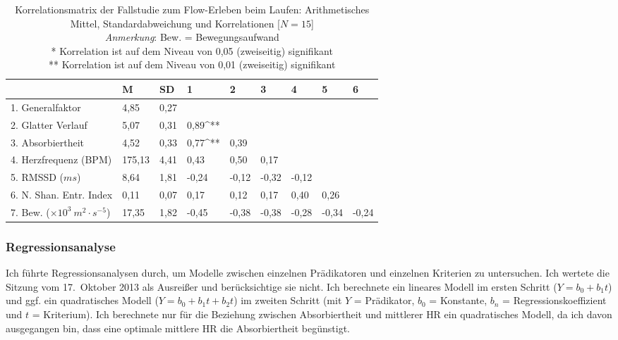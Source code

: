 \begin{sidewaystable}
\centering
	\caption[Korrelationsmatrix (Fallstudie: Laufen)]{Korrelationsmatrix der Fallstudie zum Flow-Erleben beim Laufen: Arithmetisches Mittel, Standardabweichung und Korrelationen [$N = 15$]\\ \hspace{\textwidth} \emph{Anmerkung}: Bew. = Bewegungsaufwand \\ \hspace{\textwidth}* Korrelation ist auf dem Niveau von 0,05 (zweiseitig) signifikant \\ \hspace{\textwidth}** Korrelation ist auf dem Niveau von 0,01 (zweiseitig) signifikant}
	\label{tab:korrelationen_fallstudie_laufen}
\begin{tabular}{lxxxxxxxx}
\toprule
& M & SD & 1 & 2 & 3 & 4 & 5 & 6 \\
. Generalfaktor & 4,85 & 0,27 & & & & & & \\
2. Glatter Verlauf & 5,07 & 0,31 & 0,89^{**} & & & & & \\
3. Absorbiertheit & 4,52 & 0,33 & 0,77^{**} & 0,39 & & & & \\
4. Herzfrequenz (BPM) & 175,13 & 4,41 & 0,43 & 0,50 & 0,17 & & & \\
5. RMSSD ($ms$) & 8,64 & 1,81 & -0,24 & -0,12 & -0,32 & -0,12 & & \\
6. N. Shan. Entr. Index & 0,11 & 0,07 & 0,17 & 0,12 & 0,17 & 0,40 & 0,26 & \\
7. Bew. ($\times 10^3 \: m^2 \cdot s^{-5}$) & 17,35 & 1,82 & -0,45 & -0,38 & -0,38 & -0,28 & -0,34 & -0,24 \\
\bottomrule
\bottomrule
\end{tabular}
\end{sidewaystable}

\subsubsection{Regressionsanalyse}
Ich führte Regressionsanalysen durch, um Modelle zwischen einzelnen Prädikatoren und einzelnen Kriterien zu untersuchen. Ich wertete die Sitzung vom 17.~Oktober 2013 als Ausreißer und berücksichtige sie nicht. Ich berechnete ein lineares Modell im ersten Schritt ($Y = b_{0} + b_{1}t$) und ggf. ein quadratisches Modell ($Y = b_{0} + b_{1}t + b_{2}t$) im zweiten Schritt (mit $Y$ = Prädikator, $b_{0}$ = Konstante, $b_{n}$ = Regressionskoeffizient und $t$ = Kriterium). Ich berechnete nur für die Beziehung zwischen Absorbiertheit und mittlerer \ac{HR} ein quadratisches Modell, da ich davon ausgegangen bin, dass eine optimale mittlere \ac{HR} die Absorbiertheit begünstigt.

